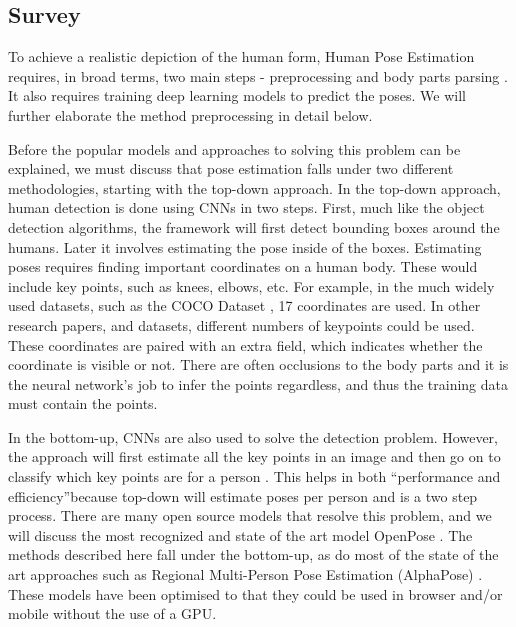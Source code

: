 \documentclass[12pt]{extarticle}
\begin{document}
\subsection{Survey}
To achieve a realistic depiction of the human form, Human Pose Estimation
requires, in broad terms, two main steps - preprocessing and body parts parsing
\cite{LiuZhao2015Asoh}. It also requires training deep learning models to
predict the poses. We will further elaborate the method preprocessing in detail
below.

Before the popular models and approaches to solving this problem can be explained, we
must discuss that pose estimation falls under two different methodologies,
starting with the top-down approach. In the top-down approach, human detection
is done using CNNs in two steps. First, much like the object detection
algorithms, the framework will first detect bounding boxes around the humans.
Later it involves estimating the pose inside of the boxes. Estimating poses
requires finding important coordinates on a human body. These would include key
points, such as knees, elbows, etc. For example, in the much widely used
datasets, such as the COCO Dataset \cite{guler2018densepose}, 17 coordinates are
used. In other research papers, and datasets, different numbers of keypoints
could be used. These coordinates are paired with an extra field, which indicates
whether the coordinate is visible or not. There are often occlusions to the body
parts and it is the neural network’s job to infer the points regardless, and
thus the training data must contain the points.

In the bottom-up, CNNs are also used to solve the detection problem. However,
the approach will first estimate all the key points in an image and then go on
to classify which key points are for a person \cite{CaoZhe2021ORM2}. This helps
in both “performance and efficiency”because top-down will estimate poses per
person and is a two step process. There are many open source models that resolve
this problem, and we will discuss the most recognized and state of the art model
OpenPose \cite{CaoZhe2021ORM2}. The methods described here fall under the
bottom-up, as do most of the state of the art approaches such as Regional
Multi-Person Pose Estimation (AlphaPose) \cite{DBLP:journals/corr/FangXL16} .
These models have been optimised to that they could be used in browser and/or
mobile without the use of a GPU.
\end{document}
